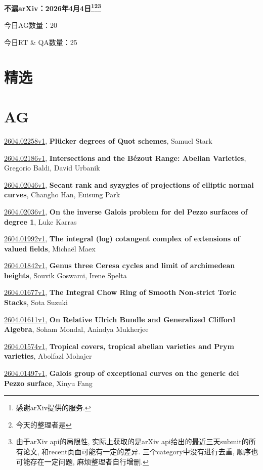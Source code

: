 \documentclass[9pt, a4paper]{article}
\theoremstyle{plain}
\theoremstyle{definition}
\theoremstyle{remark}
\newcommand{\arxiv}[3]{\href{https://arxiv.org/abs/#1}{#1}, \textbf{\textcolor{arxivblue}{#2}}, #3}
\newcommand{\AGnumber}{20}
\newcommand{\RTQAnumber}{25}
\newcommand{\NewestDate}{2026年4月4日}
\newcommand{\todayarXiver}{} %
\begin{document}
\begin{center}
    \Huge\textbf{不漏arXiv：\NewestDate\footnote{感谢arXiv提供的服务.}\footnote{今天的整理者是\todayarXiver}\footnote{由于arXiv api的局限性, 实际上获取的是arXiv api给出的最近三天submit的所有论文, 和recent页面可能有一定的差异. 三个category中没有进行去重, 顺序也可能存在一定问题, 麻烦整理者自行增删.}} \\
\end{center}

\setcounter{section}{-1}

\begin{center}
    今日AG数量：\AGnumber
    
    今日RT \& QA数量：\RTQAnumber
    
\end{center}


\section{精选}


\section{AG}
\arxiv{2604.02258v1}{Plücker degrees of Quot schemes}{Samuel Stark}

\arxiv{2604.02186v1}{Intersections and the Bézout Range: Abelian Varieties}{Gregorio Baldi, David Urbanik}

\arxiv{2604.02046v1}{Secant rank and syzygies of projections of elliptic normal curves}{Changho Han, Euisung Park}

\arxiv{2604.02036v1}{On the inverse Galois problem for del Pezzo surfaces of degree 1}{Luke Karras}

\arxiv{2604.01992v1}{The integral (log) cotangent complex of extensions of valued fields}{Michaël Maex}

\arxiv{2604.01842v1}{Genus three Ceresa cycles and limit of archimedean heights}{Souvik Goswami, Irene Spelta}

\arxiv{2604.01677v1}{The Integral Chow Ring of Smooth Non-strict Toric Stacks}{Sota Suzuki}

\arxiv{2604.01611v1}{On Relative Ulrich Bundle and Generalized Clifford Algebra}{Soham Mondal, Anindya Mukherjee}

\arxiv{2604.01574v1}{Tropical covers, tropical abelian varieties and Prym varieties}{Abolfazl Mohajer}

\arxiv{2604.01497v1}{Galois group of exceptional curves on the generic del Pezzo surface}{Xinyu Fang}
\end{document}
